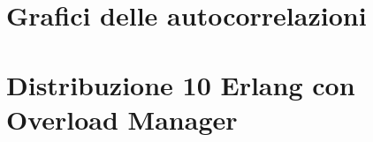 \section{Grafici delle autocorrelazioni}
\begin{comment}
\begin{figure}[H]
	\begin{center}
	\texttt{[image: grafici\_Autocorrelazione/seed625435336.png]}
	\caption[Autocorrelazione per il seed 625435336]{Autocorrelazione per il seed 625435336.}
	\label{fig:exp_res_time}
	\end{center}
\end{figure}
\begin{figure}[H]
	\begin{center}
	\texttt{[image: grafici\_Autocorrelazione/ThroughputSessions.png]}
	\caption[Throughput del sistema senza Overload Management (Legge Front-End:Iperesponenziale)]{Throughput del sistema senza Overload Management (Legge Front-End:Iperesponenziale).}
	\label{fig:exp_res_time}
	\end{center}
\end{figure}

\begin{figure}[H]
	\begin{center}
	\texttt{[image: grafici\_Autocorrelazione/ThroughputSessions.png]}
	\caption[Throughput del sistema senza Overload Management (Legge Front-End:Iperesponenziale)]{Throughput del sistema senza Overload Management (Legge Front-End:Iperesponenziale).}
	\label{fig:exp_res_time}
	\end{center}
\end{figure}
\end{comment}
\section{Distribuzione 10 Erlang con Overload Manager}
\begin{comment}
\begin{figure}[H]
	\begin{center}
	\texttt{[image: grafici\_10-Erlang\_OM/AverageResponseTime.png]}
	\caption[Tempo di risposta del sistema con Overload Management (Legge Front-End:10-Erlang)]
	{Tempo di risposta del sistema con Overload Management (Legge Front-End:10-Erlang)}
	\label{fig:exp_res_time}
	\end{center}
	\end{figure}

\begin{figure}[H]
	\begin{center}
	\texttt{[image: grafici\_10-Erlang\_OM/ThroughputSessions.png]}
	\caption[Throughput di risposta del sistema con Overload Management (Legge Front-End:10-Erlang)]
	{Throughput di risposta del sistema con Overload Management (Legge Front-End:10-Erlang)}
	\label{fig:exp_res_time}
	\end{center}
	\end{figure}
\end{comment}
